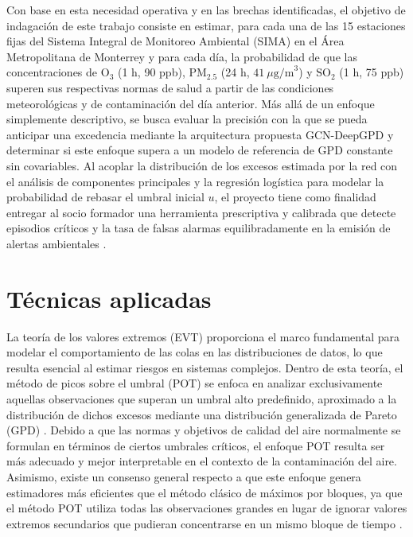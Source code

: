 \documentclass[11pt]{article}
\begin{document}
Con base en esta necesidad operativa y en las brechas identificadas, el objetivo de indagación de este trabajo consiste en estimar, para cada una de las 15 estaciones fijas del Sistema Integral de Monitoreo Ambiental (SIMA) en el Área Metropolitana de Monterrey y para cada día, la probabilidad de que las concentraciones de $\text{O}_{3}$ (1 h, 90 ppb), $\text{PM}_{2.5}$ (24 h, $41~\mu\text{g/m}^{3}$) y $\text{SO}_{2}$ (1 h, 75 ppb) superen sus respectivas normas de salud a partir de las condiciones meteorológicas y de contaminación del día anterior. Más allá de un enfoque simplemente descriptivo, se busca evaluar la precisión con la que se pueda anticipar una excedencia mediante la arquitectura propuesta GCN-DeepGPD y determinar si este enfoque supera a un modelo de referencia de GPD constante sin covariables. Al acoplar la distribución de los excesos estimada por la red con el análisis de componentes principales y la regresión logística para modelar la probabilidad de rebasar el umbral inicial $u$, el proyecto tiene como finalidad entregar al socio formador una herramienta prescriptiva y calibrada que detecte episodios críticos y la tasa de falsas alarmas equilibradamente en la emisión de alertas ambientales \cite{panja2026}.

\section{Técnicas aplicadas} %

La teoría de los valores extremos (EVT) proporciona el marco fundamental para modelar el comportamiento de las colas en las distribuciones de datos, lo que resulta esencial al estimar riesgos en sistemas complejos. Dentro de esta teoría, el método de picos sobre el umbral (POT) se enfoca en analizar exclusivamente aquellas observaciones que superan un umbral alto predefinido, aproximado a la distribución de dichos excesos mediante una distribución generalizada de Pareto (GPD) \cite{Coles2001}. Debido a que las normas y objetivos de calidad del aire normalmente se formulan en términos de ciertos umbrales críticos, el enfoque POT resulta ser más adecuado y mejor interpretable en el contexto de la contaminación del aire. Asimismo, existe un consenso general respecto a que este enfoque genera estimadores más eficientes que el método clásico de máximos por bloques, ya que el método POT utiliza todas las observaciones grandes en lugar de ignorar valores extremos secundarios que pudieran concentrarse en un mismo bloque de tiempo \cite{gyarmati2017}. 
\end{document}
